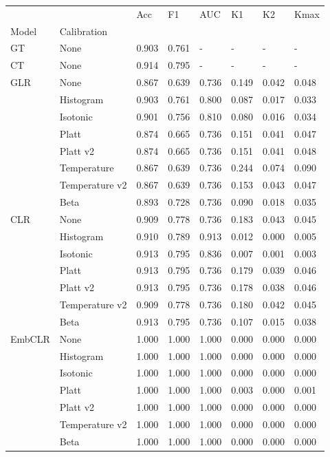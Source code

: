 \begin{tabular}{llllllll}
\toprule
 &  & Acc & F1 & AUC & K1 & K2 & Kmax \\
Model & Calibration &  &  &  &  &  &  \\
\midrule
GT & None & 0.903 & 0.761 & - & - & - & - \\
\cline{1-8}
CT & None & 0.914 & 0.795 & - & - & - & - \\
\cline{1-8}
\multirow[t]{8}{*}{GLR} & None & 0.867 & 0.639 & 0.736 & 0.149 & 0.042 & 0.048 \\
 & Histogram & 0.903 & 0.761 & 0.800 & 0.087 & 0.017 & 0.033 \\
 & Isotonic & 0.901 & 0.756 & 0.810 & 0.080 & 0.016 & 0.034 \\
 & Platt & 0.874 & 0.665 & 0.736 & 0.151 & 0.041 & 0.047 \\
 & Platt v2 & 0.874 & 0.665 & 0.736 & 0.151 & 0.041 & 0.048 \\
 & Temperature & 0.867 & 0.639 & 0.736 & 0.244 & 0.074 & 0.090 \\
 & Temperature v2 & 0.867 & 0.639 & 0.736 & 0.153 & 0.043 & 0.047 \\
 & Beta & 0.893 & 0.728 & 0.736 & 0.090 & 0.018 & 0.035 \\
\cline{1-8}
\multirow[t]{7}{*}{CLR} & None & 0.909 & 0.778 & 0.736 & 0.183 & 0.043 & 0.045 \\
 & Histogram & 0.910 & 0.789 & 0.913 & 0.012 & 0.000 & 0.005 \\
 & Isotonic & 0.913 & 0.795 & 0.836 & 0.007 & 0.001 & 0.003 \\
 & Platt & 0.913 & 0.795 & 0.736 & 0.179 & 0.039 & 0.046 \\
 & Platt v2 & 0.913 & 0.795 & 0.736 & 0.178 & 0.038 & 0.046 \\
 & Temperature v2 & 0.909 & 0.778 & 0.736 & 0.180 & 0.042 & 0.045 \\
 & Beta & 0.913 & 0.795 & 0.736 & 0.107 & 0.015 & 0.038 \\
\cline{1-8}
\multirow[t]{7}{*}{EmbCLR} & None & 1.000 & 1.000 & 1.000 & 0.000 & 0.000 & 0.000 \\
 & Histogram & 1.000 & 1.000 & 1.000 & 0.000 & 0.000 & 0.000 \\
 & Isotonic & 1.000 & 1.000 & 1.000 & 0.000 & 0.000 & 0.000 \\
 & Platt & 1.000 & 1.000 & 1.000 & 0.003 & 0.000 & 0.001 \\
 & Platt v2 & 1.000 & 1.000 & 1.000 & 0.000 & 0.000 & 0.000 \\
 & Temperature v2 & 1.000 & 1.000 & 1.000 & 0.000 & 0.000 & 0.000 \\
 & Beta & 1.000 & 1.000 & 1.000 & 0.000 & 0.000 & 0.000 \\
\cline{1-8}
\bottomrule
\end{tabular}
